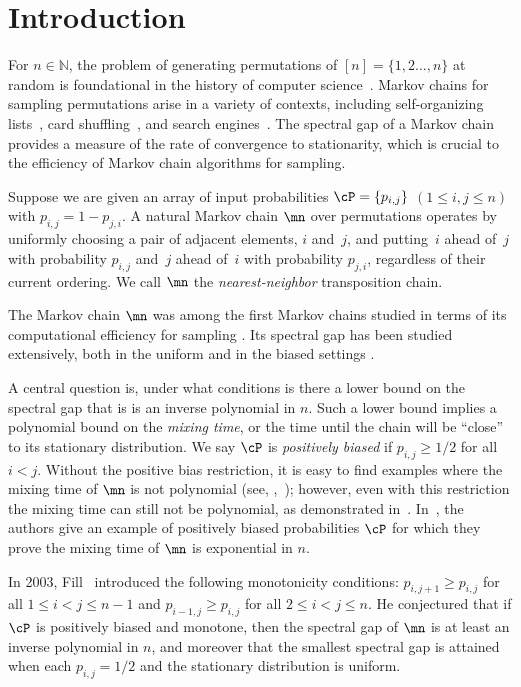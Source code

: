 
%
%
%
\section{Introduction}\label{sec:intro}

For $n\in\mathbb{N}$, the problem of generating permutations of 
$[n]=\{1,2\dots,n\}$ at random is foundational in the history of 
computer science~\cite{knuth2}. Markov chains for sampling permutations 
arise in a variety of contexts, including self-organizing 
lists~\cite{selforganizingsurvey, rivest}, card shuffling~\cite{bd, 
wilson}, and search engines~\cite{search}. The spectral gap of a Markov 
chain provides a measure of the rate of convergence to stationarity, 
which is crucial to the efficiency of Markov chain algorithms for 
sampling.

Suppose we are given %
%
an array  %
of input probabilities $\cP = \{p_{i,j}\}$ 
%
%
%
$(1 \leq i, j \leq n)$   %
with $p_{i, j} = 1-p_{j, i}$.  A natural 
Markov chain $\mn$ over permutations operates by uniformly choosing a 
pair of adjacent elements, $i$ and~$j$, and putting~$i$ ahead of~$j$ 
with probability $p_{i,j}$ and~$j$ ahead of~$i$ with probability 
$p_{j,i}$, %
%
regardless   %
of their current ordering.  We call $\mn$ the 
\emph{nearest-neighbor} transposition chain.

The Markov chain $\mn$ was among the first Markov chains studied in 
terms of its computational efficiency for sampling \cite{ald, diasha, 
dsc}. Its spectral gap has been studied extensively, both in 
the uniform and
in the  %
biased settings \cite{BBHM05,bmrs,DSC93b, diasha, wilson}. 

%
%
A central question is, %
under what conditions %
is there a lower bound on the spectral gap that is
is an inverse polynomial in $n$.
%
Such a lower bound    %
implies a polynomial
%
bound 
on the \emph{mixing time}, or the time until the chain will be 
``close'' to its stationary distribution. We say $\cP$ is 
\emph{positively biased} if $p_{i,j}\geq 1/2$ for all $i<j$.
Without the %
%
positive bias  %
restriction, it is easy to find examples where the mixing time of $\mn$ is
not polynomial (see, \eg,~\cite{bmrs}); 
however, even with this restriction the mixing time can still not be polynomial, as demonstrated in~\cite{bmrs}.  In~\cite{bmrs}, the authors give an example of positively biased probabilities $\cP$ for which they prove the mixing time of $\mn$ is exponential in $n.$

In 2003, %
Fill~\cite{F03}  %
introduced the following monotonicity 
conditions: $p_{i,j+1}\geq p_{i,j}$ for all $1\leq i<j\leq n-1$ and 
$p_{i-1,j}\geq p_{i,j}$ for all $2\leq i<j\leq n$.  He conjectured that  
if $\cP$ is positively biased and monotone, then the spectral gap of 
$\mn$ is  %
at least  %
an inverse polynomial in $n$, and moreover that the smallest 
spectral gap is attained when each $p_{i,j}=1/2$ and the stationary 
distribution is uniform. 

